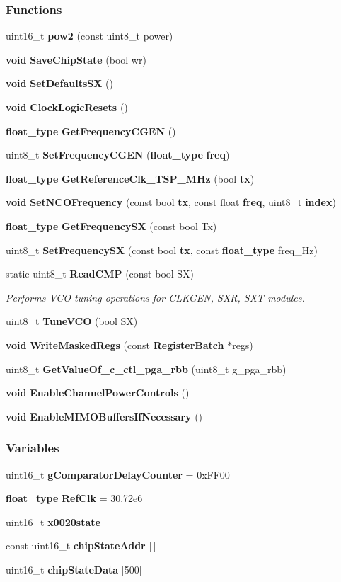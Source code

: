 \subsubsection*{Functions}
\begin{DoxyCompactItemize}
\item 
uint16\+\_\+t {\bf pow2} (const uint8\+\_\+t power)
\item 
{\bf void} {\bf Save\+Chip\+State} (bool wr)
\item 
{\bf void} {\bf Set\+Defaults\+SX} ()
\item 
{\bf void} {\bf Clock\+Logic\+Resets} ()
\item 
{\bf float\+\_\+type} {\bf Get\+Frequency\+C\+G\+EN} ()
\item 
uint8\+\_\+t {\bf Set\+Frequency\+C\+G\+EN} ({\bf float\+\_\+type} {\bf freq})
\item 
{\bf float\+\_\+type} {\bf Get\+Reference\+Clk\+\_\+\+T\+S\+P\+\_\+\+M\+Hz} (bool {\bf tx})
\item 
{\bf void} {\bf Set\+N\+C\+O\+Frequency} (const bool {\bf tx}, const float {\bf freq}, uint8\+\_\+t {\bf index})
\item 
{\bf float\+\_\+type} {\bf Get\+Frequency\+SX} (const bool Tx)
\item 
uint8\+\_\+t {\bf Set\+Frequency\+SX} (const bool {\bf tx}, const {\bf float\+\_\+type} freq\+\_\+\+Hz)
\item 
static uint8\+\_\+t {\bf Read\+C\+MP} (const bool SX)
\begin{DoxyCompactList}\small\item\em Performs V\+CO tuning operations for C\+L\+K\+G\+EN, S\+XR, S\+XT modules. \end{DoxyCompactList}\item 
uint8\+\_\+t {\bf Tune\+V\+CO} (bool SX)
\item 
{\bf void} {\bf Write\+Masked\+Regs} (const {\bf Register\+Batch} $\ast$regs)
\item 
uint8\+\_\+t {\bf Get\+Value\+Of\+\_\+c\+\_\+ctl\+\_\+pga\+\_\+rbb} (uint8\+\_\+t g\+\_\+pga\+\_\+rbb)
\item 
{\bf void} {\bf Enable\+Channel\+Power\+Controls} ()
\item 
{\bf void} {\bf Enable\+M\+I\+M\+O\+Buffers\+If\+Necessary} ()
\end{DoxyCompactItemize}
\subsubsection*{Variables}
\begin{DoxyCompactItemize}
\item 
uint16\+\_\+t {\bf g\+Comparator\+Delay\+Counter} = 0x\+F\+F00
\item 
{\bf float\+\_\+type} {\bf Ref\+Clk} = 30.\+72e6
\item 
uint16\+\_\+t {\bf x0020state}
\item 
const uint16\+\_\+t {\bf chip\+State\+Addr} [$\,$]
\item 
uint16\+\_\+t {\bf chip\+State\+Data} [500]
\end{DoxyCompactItemize}


